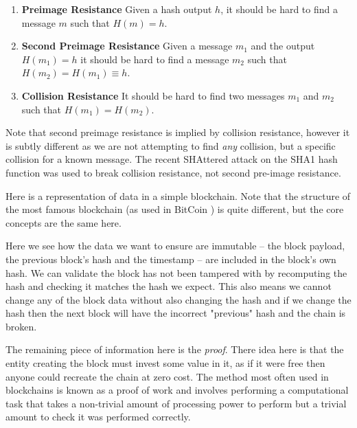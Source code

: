 \begin{enumerate}
    \item \textbf{Preimage Resistance} Given a hash output $h$, it should be hard to find a message $m$ such that $H(m) = h$.
    \item \textbf{Second Preimage Resistance} Given a message $m_1$ and the output $H(m_1) = h$ it should be hard to find a message $m_2$ such that $H(m_2) = H(m_1) \equiv h$.
    \item \textbf{Collision Resistance} It should be hard to find two messages $m_1$ and $m_2$ such that $H(m_1) = H(m_2)$.
\end{enumerate}

Note that second preimage resistance is implied by collision resistance, however it is subtly different as we are not attempting to find \emph{any} collision, but a specific collision for a known message. The recent SHAttered \cite{katz_first_2017} attack on the SHA1 hash function was used to break collision resistance, not second pre-image resistance.

Here is a representation of data in a simple blockchain. Note that the structure of the most famous blockchain (as used in BitCoin ) is quite different, but the core concepts are the same here.


Here we see how the data we want to ensure are immutable -- the block payload, the previous block's hash and the timestamp -- are included in the block's own hash.  We can validate the block has not been tampered with by recomputing the hash and checking it matches the hash we expect. This also means we cannot change any of the block data without also changing the hash and if we change the hash then the next block will have the incorrect "previous" hash and the chain is broken.

The remaining piece of information here is the \emph{proof}. There idea here is that the entity creating the block must invest some value in it, as if it were free then anyone could recreate the chain at zero cost. The method most often used in blockchains is known as a proof of work and involves performing a computational task that takes a non-trivial amount of processing power to perform but a trivial amount to check it was performed correctly.

